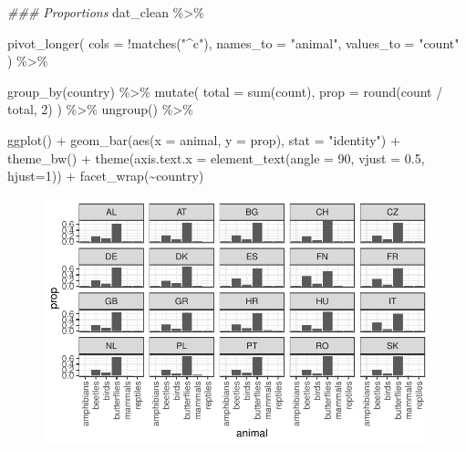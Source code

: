 \documentclass[
  letterpaper,
  DIV=11,
  numbers=noendperiod]{scrreprt}
\newenvironment{Shaded}{\begin{snugshade}}{\end{snugshade}}
\newcommand{\AttributeTok}[1]{\textcolor[rgb]{0.40,0.45,0.13}{#1}}
\newcommand{\DecValTok}[1]{\textcolor[rgb]{0.68,0.00,0.00}{#1}}
\newcommand{\DocumentationTok}[1]{\textcolor[rgb]{0.37,0.37,0.37}{\textit{#1}}}
\newcommand{\FloatTok}[1]{\textcolor[rgb]{0.68,0.00,0.00}{#1}}
\newcommand{\FunctionTok}[1]{\textcolor[rgb]{0.28,0.35,0.67}{#1}}
\newcommand{\NormalTok}[1]{\textcolor[rgb]{0.00,0.23,0.31}{#1}}
\newcommand{\SpecialCharTok}[1]{\textcolor[rgb]{0.37,0.37,0.37}{#1}}
\newcommand{\StringTok}[1]{\textcolor[rgb]{0.13,0.47,0.30}{#1}}
\begin{document}
\begin{Shaded}
\begin{Highlighting}[]
\DocumentationTok{\#\#\# Proportions}
\NormalTok{dat\_clean }\SpecialCharTok{\%\textgreater{}\%} 
  
  \FunctionTok{pivot\_longer}\NormalTok{(}
    \AttributeTok{cols      =} \SpecialCharTok{!}\FunctionTok{matches}\NormalTok{(}\StringTok{"\^{}c"}\NormalTok{),}
    \AttributeTok{names\_to  =} \StringTok{"animal"}\NormalTok{,}
    \AttributeTok{values\_to =} \StringTok{"count"}
\NormalTok{  ) }\SpecialCharTok{\%\textgreater{}\%} 
  
  \FunctionTok{group\_by}\NormalTok{(country) }\SpecialCharTok{\%\textgreater{}\%} 
  \FunctionTok{mutate}\NormalTok{(}
    \AttributeTok{total =} \FunctionTok{sum}\NormalTok{(count), }
    \AttributeTok{prop  =} \FunctionTok{round}\NormalTok{(count }\SpecialCharTok{/}\NormalTok{ total, }\DecValTok{2}\NormalTok{)}
\NormalTok{  ) }\SpecialCharTok{\%\textgreater{}\%} 
  \FunctionTok{ungroup}\NormalTok{() }\SpecialCharTok{\%\textgreater{}\%} 

  \FunctionTok{ggplot}\NormalTok{() }\SpecialCharTok{+} 
  \FunctionTok{geom\_bar}\NormalTok{(}\FunctionTok{aes}\NormalTok{(}\AttributeTok{x =}\NormalTok{ animal, }\AttributeTok{y =}\NormalTok{ prop), }\AttributeTok{stat =} \StringTok{"identity"}\NormalTok{) }\SpecialCharTok{+} 
  \FunctionTok{theme\_bw}\NormalTok{() }\SpecialCharTok{+} 
  \FunctionTok{theme}\NormalTok{(}\AttributeTok{axis.text.x =} \FunctionTok{element\_text}\NormalTok{(}\AttributeTok{angle =} \DecValTok{90}\NormalTok{, }\AttributeTok{vjust =} \FloatTok{0.5}\NormalTok{, }\AttributeTok{hjust=}\DecValTok{1}\NormalTok{)) }\SpecialCharTok{+}
  \FunctionTok{facet\_wrap}\NormalTok{(}\SpecialCharTok{\textasciitilde{}}\NormalTok{country)}
\end{Highlighting}
\end{Shaded}

\begin{figure}[H]

{\centering \includegraphics{./modification-indexes_files/figure-pdf/unnamed-chunk-3-1.pdf}

}

\end{figure}
\end{document}
